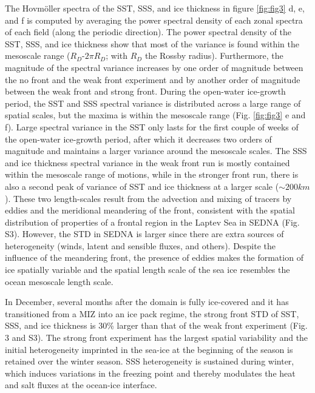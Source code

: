 \documentclass[draft]{agujournal2019}
\begin{document}
The Hovm\"oller spectra of the SST, SSS, and ice thickness in figure \ref{fig:fig3} d, e, and f is computed by averaging the power spectral density of each zonal spectra of each field (along the periodic direction). The power spectral density of the SST, SSS, and ice thickness show that most of the variance is found within the mesoscale range ($R_D$-$2\pi R_D$; with $R_D$ the Rossby radius). Furthermore, the magnitude of the spectral variance increases by one order of magnitude between the no front and the weak front experiment and by another order of magnitude between the weak front and strong front. During the open-water ice-growth period, the SST and SSS spectral variance is distributed across a large range of spatial scales, but the maxima is within the mesoscale range (Fig. \ref{fig:fig3} e and f). Large spectral variance in the SST only lasts for the first couple of weeks of the open-water ice-growth period, after which it decreases two orders of magnitude and maintains a larger variance around the mesoscale scales. 
The SSS and ice thickness spectral variance in the weak front run is mostly contained within the mesoscale range of motions, while in the stronger front run, there is also a second peak of variance of SST and ice thickness at a larger scale ($\sim 200km$). These two length-scales result from the advection and mixing of tracers by eddies and the meridional meandering of the front, consistent with the spatial distribution of properties of a frontal region in the Laptev Sea in SEDNA (Fig. S3). However, the STD in SEDNA is larger since there are extra sources of heterogeneity (winds, latent and sensible fluxes, and others). Despite the influence of the meandering front, the presence of eddies makes the formation of ice spatially variable and the spatial length scale of the sea ice resembles the ocean mesoscale length scale. 

In December, several months after the domain is fully ice-covered and it has transitioned from a MIZ into an ice pack regime, the strong front STD of SST, SSS, and ice thickness is 30\% larger than that of the weak front experiment (Fig. 3 and S3). The strong front experiment has the largest spatial variability and the initial heterogeneity imprinted in the sea-ice at the beginning of the season is retained over the winter season. SSS heterogeneity is sustained during winter, which induces variations in the freezing point and thereby modulates the heat and salt fluxes at the ocean-ice interface.
\end{document}
